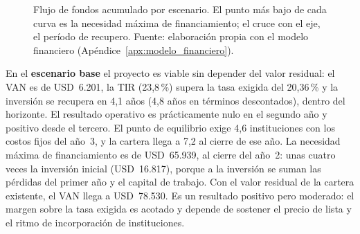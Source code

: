 \begin{figure}[htbp]
    \centering
    \caption[Flujo de fondos acumulado por escenario]{Flujo de fondos acumulado por escenario. El punto más bajo de cada curva es la necesidad máxima de financiamiento; el cruce con el eje, el período de recupero. Fuente: elaboración propia con el modelo financiero (Apéndice~\ref{apx:modelo_financiero}).}
    \label{fig:neg_acumulado}
\end{figure}

En el \textbf{escenario base} el proyecto es viable sin depender del valor residual: el VAN es de USD~6.201, la TIR (23,8\,\%) supera la tasa exigida del 20,36\,\% y la inversión se recupera en 4,1 años (4,8 años en términos descontados), dentro del horizonte. El resultado operativo es prácticamente nulo en el segundo año y positivo desde el tercero. El punto de equilibrio exige 4,6 instituciones con los costos fijos del año~3, y la cartera llega a 7,2 al cierre de ese año. La necesidad máxima de financiamiento es de USD~65.939, al cierre del año~2: unas cuatro veces la inversión inicial (USD~16.817), porque a la inversión se suman las pérdidas del primer año y el capital de trabajo. Con el valor residual de la cartera existente, el VAN llega a USD~78.530. Es un resultado positivo pero moderado: el margen sobre la tasa exigida es acotado y depende de sostener el precio de lista y el ritmo de incorporación de instituciones.

